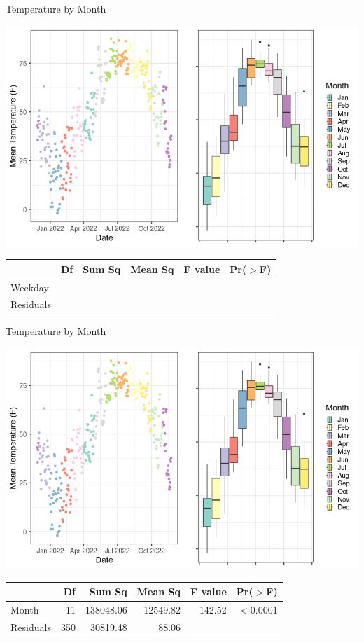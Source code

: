 \documentclass{beamer}
\begin{document}
\begin{frame}{Temperature by Month}
\begin{center}
\includegraphics[scale=0.35]{img/tmp_month.png}
\end{center}
{\footnotesize
\begin{table}[ht]
\centering
\begin{tabular}{lrrrrr}
  \hline
 & Df & Sum Sq & Mean Sq & F value & Pr($>$F) \\ 
  \hline
Weekday     &  &  &  &  &  \\ 
  Residuals   &  &  &  &  &  \\ 
   \hline
\end{tabular}
\end{table}
}
\end{frame}

\begin{frame}{Temperature by Month}
\begin{center}
\includegraphics[scale=0.35]{img/tmp_month.png}
\end{center}
{\footnotesize
\begin{table}[ht]
\centering
\begin{tabular}{lrrrrr}
  \hline
 & Df & Sum Sq & Mean Sq & F value & Pr($>$F) \\ 
  \hline
Month       & 11 & 138048.06 & 12549.82 & 142.52 & $<$0.0001 \\ 
  Residuals   & 350 & 30819.48 & 88.06 &  &  \\ 
   \hline
\end{tabular}
\end{table}
}
\end{frame}
\end{document}
